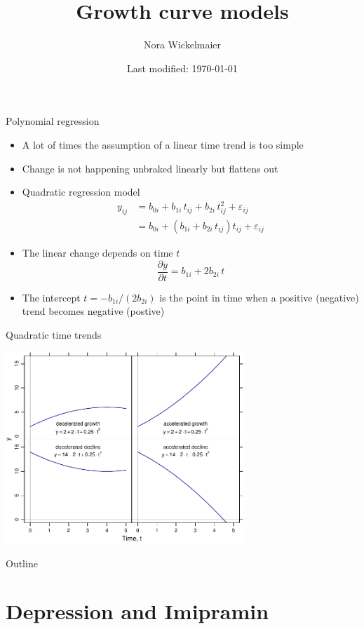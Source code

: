 \documentclass[aspectratio=169]{beamer}
\title{Growth curve models}
\author{Nora Wickelmaier}
\date{Last modified: \today}
\begin{document}
\begin{frame}{}
\thispagestyle{empty}
\titlepage
\end{frame}

\begin{frame}{Polynomial regression}
  \begin{itemize}
    \item A lot of times the assumption of a linear time trend is too
      simple
    \item Change is not happening unbraked linearly but flattens out
    \item Quadratic regression model
\begin{align*}
  y_{ij} &= b_{0i} + b_{1i}\,t_{ij} + b_{2i}\,t^2_{ij} + \varepsilon_{ij}\\
         &= b_{0i} + (b_{1i} + b_{2i}\,t_{ij}) t_{ij}  + \varepsilon_{ij}
\end{align*}
    \item The linear change depends on time $t$
\[
  \frac{\partial y}{\partial t} = b_{1i} + 2b_{2i} \, t
\]
    \item The intercept $t = -b_{1i}/(2 b_{2i})$ is the point in time when a
      positive (negative) trend becomes negative (postive)
  \end{itemize}
\end{frame}

\begin{frame}{Quadratic time trends}
\begin{center}
\includegraphics[width=9cm]{../figures/quad}
\end{center}
\end{frame}

\begin{frame}{Outline}
\tableofcontents
\end{frame}

\section{Depression and Imipramin}
\end{document}
